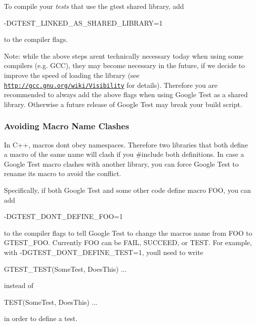 To compile your {\itshape tests} that use the gtest shared library, add \begin{DoxyVerb}-DGTEST_LINKED_AS_SHARED_LIBRARY=1
\end{DoxyVerb}


to the compiler flags.

Note\+: while the above steps aren\textquotesingle{}t technically necessary today when using some compilers (e.\+g. G\+CC), they may become necessary in the future, if we decide to improve the speed of loading the library (see \href{http://gcc.gnu.org/wiki/Visibility}{\tt http\+://gcc.\+gnu.\+org/wiki/\+Visibility} for details). Therefore you are recommended to always add the above flags when using Google Test as a shared library. Otherwise a future release of Google Test may break your build script.

\subsubsection*{Avoiding Macro Name Clashes}

In C++, macros don\textquotesingle{}t obey namespaces. Therefore two libraries that both define a macro of the same name will clash if you {\ttfamily \#include} both definitions. In case a Google Test macro clashes with another library, you can force Google Test to rename its macro to avoid the conflict.

Specifically, if both Google Test and some other code define macro F\+OO, you can add \begin{DoxyVerb}-DGTEST_DONT_DEFINE_FOO=1
\end{DoxyVerb}


to the compiler flags to tell Google Test to change the macro\textquotesingle{}s name from {\ttfamily F\+OO} to {\ttfamily G\+T\+E\+S\+T\+\_\+\+F\+OO}. Currently {\ttfamily F\+OO} can be {\ttfamily F\+A\+IL}, {\ttfamily S\+U\+C\+C\+E\+ED}, or {\ttfamily T\+E\+ST}. For example, with {\ttfamily -\/\+D\+G\+T\+E\+S\+T\+\_\+\+D\+O\+N\+T\+\_\+\+D\+E\+F\+I\+N\+E\+\_\+\+T\+E\+ST=1}, you\textquotesingle{}ll need to write \begin{DoxyVerb}GTEST_TEST(SomeTest, DoesThis) { ... }
\end{DoxyVerb}


instead of \begin{DoxyVerb}TEST(SomeTest, DoesThis) { ... }
\end{DoxyVerb}


in order to define a test.

